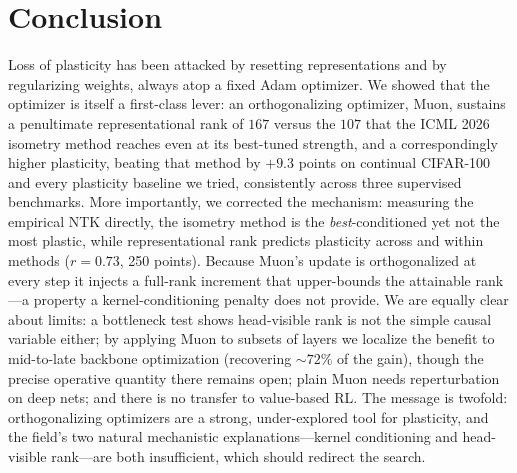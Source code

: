 \documentclass[letterpaper]{article} %
\begin{document}
\section{Conclusion}
Loss of plasticity has been attacked by resetting representations and by regularizing weights, always atop a fixed Adam optimizer. We showed that the optimizer is itself a first-class lever: an orthogonalizing optimizer, Muon, sustains a penultimate representational rank of $167$ versus the $107$ that the ICML 2026 isometry method reaches even at its best-tuned strength, and a correspondingly higher plasticity, beating that method by $+9.3$ points on continual CIFAR-100 and every plasticity baseline we tried, consistently across three supervised benchmarks. More importantly, we corrected the mechanism: measuring the empirical NTK directly, the isometry method is the \emph{best}-conditioned yet not the most plastic, while representational rank predicts plasticity across and within methods ($r{=}0.73$, 250 points). Because Muon's update is orthogonalized at every step it injects a full-rank increment that upper-bounds the attainable rank---a property a kernel-conditioning penalty does not provide. We are equally clear about limits: a bottleneck test shows head-visible rank is not the simple causal variable either; by applying Muon to subsets of layers we localize the benefit to mid-to-late backbone optimization (recovering ${\sim}72\%$ of the gain), though the precise operative quantity there remains open; plain Muon needs reperturbation on deep nets; and there is no transfer to value-based RL. The message is twofold: orthogonalizing optimizers are a strong, under-explored tool for plasticity, and the field's two natural mechanistic explanations---kernel conditioning and head-visible rank---are both insufficient, which should redirect the search.



\clearpage
\appendix
\end{document}
